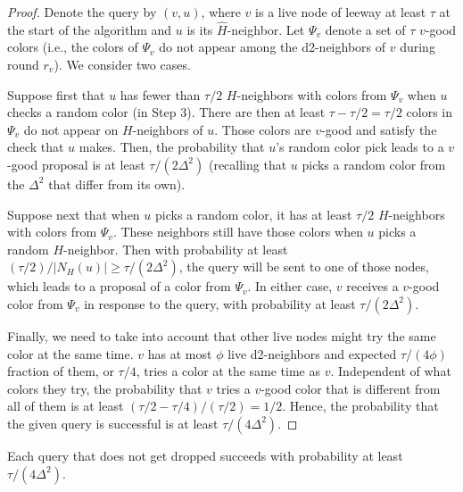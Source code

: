 \begin{proof}
Denote the query by $(v,u)$, where $v$ is a live node of leeway at least $\tau$ at the start of the algorithm and $u$ is its $\hat{H}$-neighbor.
Let $\Psi_v$ denote a set of $\tau$ $v$-good colors (i.e., the colors of $\Psi_v$ do not appear among the d2-neighbors of $v$ during round $r_v$). We consider two cases.

Suppose first that $u$ has fewer than $\tau/2$ $H$-neighbors with colors from $\Psi_v$ when $u$ checks a random color (in Step 3). There are then at least $\tau - \tau/2 = \tau/2$ colors in $\Psi_v$ do not appear on $H$-neighbors of $u$. Those colors are $v$-good and satisfy the check that $u$ makes.
Then, the probability that $u$'s random color pick leads to a $v$-good proposal  is at least $\tau/(2\Delta^2)$ (recalling that $u$ picks a random color from the $\Delta^2$ that differ from its own).

Suppose next that when $u$ picks a random color, it
has at least $\tau/2$ $H$-neighbors with colors from $\Psi_v$.  These neighbors still have those colors when $u$ picks a random $H$-neighbor.
Then with probability at least $(\tau/2)/|N_H(u)| \ge \tau / (2\Delta^2)$, the query will be sent to one of those nodes, which leads to a proposal of a color from $\Psi_v$. 
In either case, $v$ receives a $v$-good color from $\Psi_v$ in response to the query, with probability at least $\tau/(2\Delta^2)$.

Finally, we need to take into account that other live nodes might try the same color at the same time.
$v$ has at most $\phi$ live d2-neighbors and expected $\tau/(4\phi)$ fraction of them, or $\tau/4$, tries a color at the same time as $v$.
Independent of what colors they try, the probability that $v$ tries a $v$-good color that is different from all of them is at least $(\tau/2 - \tau/4)/(\tau/2) = 1/2$. 
%
Hence, the probability that the given query is successful is at least $\tau/(4\Delta^2)$.
\end{proof}

\iffalse %
\begin{lemma}
Each query that does not get dropped succeeds with probability at least $\tau/(4\Delta^2)$.
\label{L:progress}
\end{lemma}

